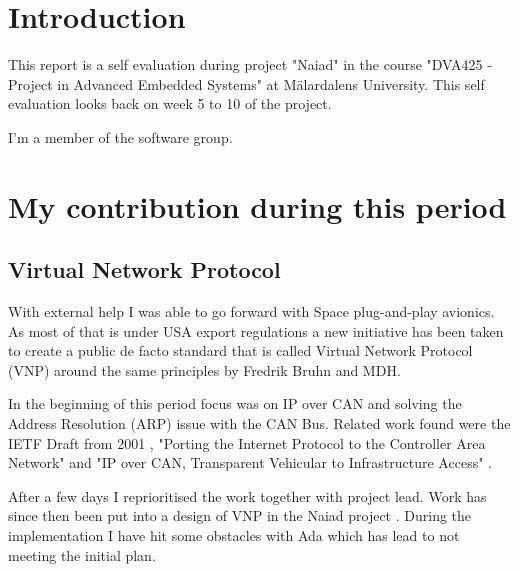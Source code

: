 \section{Introduction}
This report is a self evaluation during project "Naiad" in the course
"DVA425 - Project in Advanced Embedded Systems" at M\"{a}lardalens University.
This self evaluation looks back on week 5 to 10 of the project.

I'm a member of the software group.

\section{My contribution during this period}

\subsection{Virtual Network Protocol}
With external help I was able to go forward with Space plug-and-play avionics.
As most of that is under USA export regulations a new initiative has been
taken to create a public de facto standard that is called Virtual Network Protocol (VNP)
around the same principles by Fredrik Bruhn and MDH.

In the beginning of this period focus was on IP over CAN and solving the
Address Resolution (ARP) issue with the CAN Bus. Related work found were
the IETF Draft from 2001 \cite{ietf:ip_over_can}, "Porting the Internet Protocol
to the Controller Area Network" \cite{web:porting_ip_can} and "IP over CAN,
Transparent Vehicular to Infrastructure Access" \cite{lindgren2008}.

After a few days I reprioritised the work
together with project lead. Work has since then been put into a design
of VNP in the Naiad project \cite{web:naiad_auv_vnp, web:naiad_auv_vnp_design}.
During the implementation I have hit some obstacles with Ada which has lead to
not meeting the initial plan.

